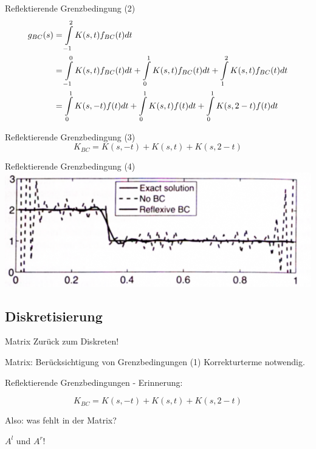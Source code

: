 \documentclass[11pt]{beamer}
\begin{document}
\begin{frame}{Reflektierende Grenzbedingung (2)}
\begin{align}
g_{BC}(s) & = \int\limits_{-1}^2 K(s,  t) f_{BC}(t) dt \notag \\
          & = \int\limits_{-1}^0 K(s,  t) f_{BC}(t) dt
            + \int\limits_{ 0}^1 K(s,  t) f_{BC}(t) dt
            + \int\limits_{ 1}^2 K(s,  t) f_{BC}(t) dt \notag \\
          & = \int\limits_{ 0}^1 K(s, -t) f     (t) dt
            + \int\limits_{ 0}^1 K(s,  t) f     (t) dt
            + \int\limits_{0 }^1 K(s,2-t) f     (t) dt \notag
\end{align}
\end{frame}


\begin{frame}{Reflektierende Grenzbedingung (3)}
 \[K_{BC} = K(s, -t) + K(s,  t) + K(s, 2-t)\]
\end{frame}


\begin{frame}{Reflektierende Grenzbedingung (4)}
\includegraphics[scale=0.38]{boundary_conditions} 
\end{frame}


\subsection{Diskretisierung}
\begin{frame}{Matrix}
Zurück zum Diskreten!
\end{frame}


\begin{frame}{Matrix: Berücksichtigung von Grenzbedingungen (1)}
Korrekturterme notwendig.

Reflektierende Grenzbedingungen - Erinnerung:

\[K_{BC} = K(s, -t) + K(s,  t) + K(s, 2-t)\]

Also: was fehlt in der Matrix?
\pause

$A^l$ und $A^r$!
\end{frame}
\end{document}
